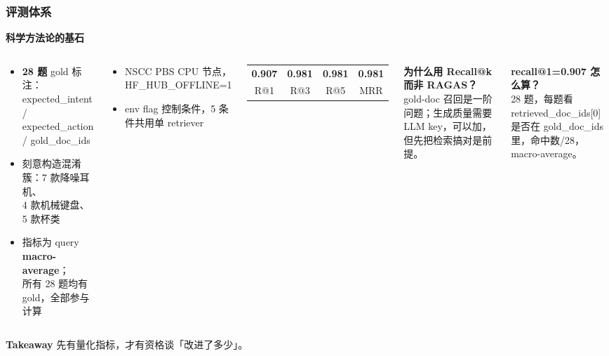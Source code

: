 \documentclass[aspectratio=169,10pt]{beamer}
\newcommand{\takeaway}[1]{%
  \vfill%
  \begin{tcolorbox}[
    colback=Ctakebg, colframe=Ctakebg,
    arc=0pt, boxrule=0pt,
    left=7pt, right=7pt, top=4pt, bottom=4pt,
    width=\linewidth, nobeforeafter
  ]%
    {\scriptsize\color{white}\textbf{Takeaway}\enspace%
     \color{white!88!Ctakebg}#1}%
  \end{tcolorbox}%
}
\newcommand{\mono}[1]{{\ttfamily\small\color{Cblue!90!black}#1}}  %
\begin{document}
\begin{frame}
\frametitle{评测体系}

{\small\bfseries\color{Cmuted}科学方法论的基石}\\[0.08cm]
\begin{columns}[T]
\begin{tcolorbox}[tcgray, title={\color{Ctextdark}评测集设计}]
\small\begin{itemize}\setlength\itemsep{0.1em}
  \item \textbf{28 题} gold 标注：\\
    \mono{expected\_intent} / \mono{expected\_action}\\
    / \mono{gold\_doc\_ids}
  \item 刻意构造混淆簇：7 款降噪耳机、\\4 款机械键盘、5 款杯类
  \item 指标为 query \textbf{macro-average}；\\所有 28 题均有 gold，全部参与计算
\end{itemize}
\end{tcolorbox}
\begin{tcolorbox}[tcgray, title={\color{Ctextdark}执行环境}]
\small\begin{itemize}\setlength\itemsep{0.1em}
  \item NSCC PBS CPU 节点，\mono{HF\_HUB\_OFFLINE=1}
  \item env flag 控制条件，5 条件共用单 retriever
\end{itemize}
\end{tcolorbox}

\begin{tcolorbox}[tcgreen, title={\color{Cgreen}Baseline 结果}]
\begin{tabular}{cccc}
{\large\bfseries\color{Cgreen}0.907} &
{\large\bfseries\color{Cgreen}0.981} &
{\large\bfseries\color{Cgreen}0.981} &
{\large\bfseries\color{Cgreen}0.981}\\
{\tiny R@1} & {\tiny R@3} & {\tiny R@5} & {\tiny MRR}
\end{tabular}
\end{tcolorbox}
\begin{tcolorbox}[tcblue]
\small\textbf{为什么用 Recall@k 而非 RAGAS？}\\[0.2em]
gold-doc 召回是一阶问题；生成质量需要 LLM key，可以加，但先把检索搞对是前提。
\end{tcolorbox}
\begin{tcolorbox}[tcgray]
\small\textbf{recall@1=0.907 怎么算？}\\
28 题，每题看 retrieved\_doc\_ids[0] 是否在 gold\_doc\_ids 里，命中数/28，macro-average。
\end{tcolorbox}
\end{columns}

\takeaway{先有量化指标，才有资格谈「改进了多少」。}
\end{frame}
\end{document}
